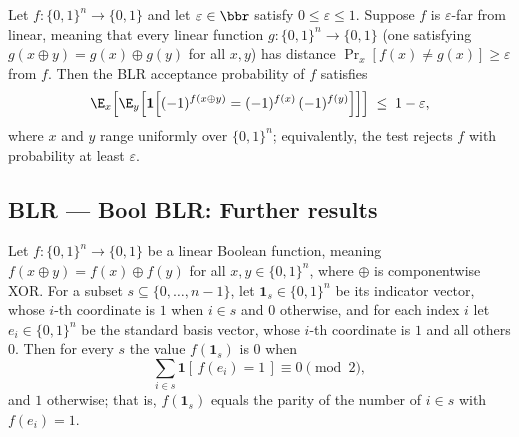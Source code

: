 \begin{lemma}
\label{BoolBLR.BLR_soundness}
\leanok
{}
Let $f : \{0,1\}^n \to \{0,1\}$ and let $\varepsilon \in \bbr$ satisfy $0 \le
\varepsilon \le 1$. Suppose $f$ is $\varepsilon$-far from linear, meaning that every
linear function $g : \{0,1\}^n \to \{0,1\}$ (one satisfying $g(x \oplus y) = g(x) \oplus
g(y)$ for all $x, y$) has distance $\Pr_{x}[f(x) \ne g(x)] \ge \varepsilon$ from $f$.
Then the BLR acceptance probability of $f$ satisfies
\[
\E_{x}\!\left[\E_{y}\!\left[\mathbf{1}\!\left[(-1)^{f(x \oplus y)} =
(-1)^{f(x)}\,(-1)^{f(y)}\right]\right]\right] \;\le\; 1 - \varepsilon,
\]
where $x$ and $y$ range uniformly over $\{0,1\}^n$; equivalently, the test rejects $f$
with probability at least $\varepsilon$.
\end{lemma}

\subsection*{BLR --- Bool BLR: Further results}

\begin{lemma}
\label{BoolBLR.linear_bool_iff_character_aux_h_fx_1}
\leanok
{}
Let $f : \{0,1\}^n \to \{0,1\}$ be a linear Boolean function, meaning $f(x \oplus y) =
f(x) \oplus f(y)$ for all $x, y \in \{0,1\}^n$, where $\oplus$ is componentwise XOR. For
a subset $s \subseteq \{0, \dots, n-1\}$, let $\mathbf{1}_s \in \{0,1\}^n$ be its
indicator vector, whose $i$-th coordinate is $1$ when $i \in s$ and $0$ otherwise, and
for each index $i$ let $e_i \in \{0,1\}^n$ be the standard basis vector, whose $i$-th
coordinate is $1$ and all others $0$. Then for every $s$ the value $f(\mathbf{1}_s)$ is
$0$ when
\[
  \sum_{i \in s} \mathbf{1}[\,f(e_i) = 1\,] \equiv 0 \pmod 2,
\]
and $1$ otherwise; that is, $f(\mathbf{1}_s)$ equals the parity of the number of $i \in
s$ with $f(e_i) = 1$.
\end{lemma}

